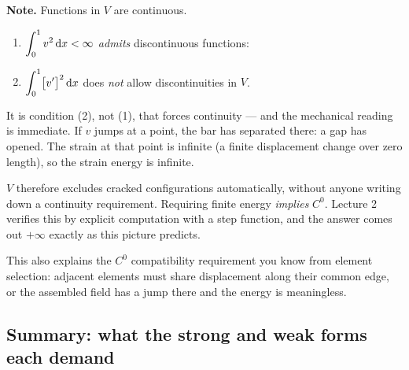 \medskip
\noindent\textbf{Note.} Functions in $V$ are continuous.
\begin{enumerate}[label=(\arabic*),leftmargin=2em,itemsep=3pt]
  \item $\displaystyle\int_{0}^{1} v^{2}\,\mathrm{d} x < \infty$ \emph{admits}
        discontinuous functions:
        \begin{center}
        \end{center}
  \item $\displaystyle\int_{0}^{1}\bigl[v'\bigr]^{2}\,\mathrm{d} x$ does \emph{not} allow
        discontinuities in $V$.
\end{enumerate}

\begin{intuition}
It is condition (2), not (1), that forces continuity --- and the mechanical
reading is immediate. If $v$ jumps at a point, the bar has separated there:
a gap has opened. The strain at that point is infinite (a finite displacement
change over zero length), so the strain energy is infinite.

$V$ therefore excludes cracked configurations automatically, without anyone
writing down a continuity requirement. Requiring finite energy \emph{implies}
$C^{0}$. Lecture 2 verifies this by explicit computation with a step function,
and the answer comes out $+\infty$ exactly as this picture predicts.

This also explains the $C^{0}$ compatibility requirement you know from element
selection: adjacent elements must share displacement along their common edge,
or the assembled field has a jump there and the energy is meaningless.
\end{intuition}

\subsection*{Summary: what the strong and weak forms each demand}

